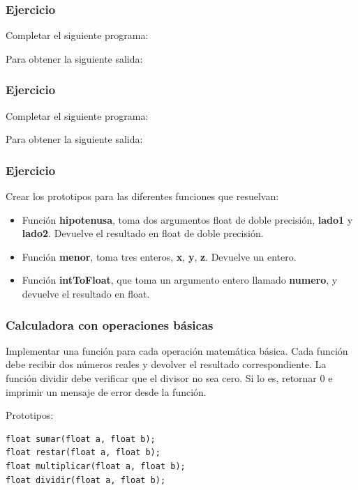 \subsubsection{Ejercicio}
Completar el siguiente programa:
\lstset{inputencoding=utf8/latin1}

Para obtener la siguiente salida:
{\small
  \lstset{inputencoding=utf8/latin1}
  
}

\subsubsection{Ejercicio}
Completar el siguiente programa:
\lstset{inputencoding=utf8/latin1}

Para obtener la siguiente salida:
{\small
  \lstset{inputencoding=utf8/latin1}
  
}

\subsubsection{Ejercicio}
Crear los prototipos para las diferentes funciones que resuelvan:
\begin{itemize}
  \item Función \textbf{hipotenusa}, toma dos argumentos float de doble precisión, \textbf{lado1} y \textbf{lado2}. Devuelve el resultado en float de doble precisión.
  \item Función \textbf{menor}, toma tres enteros, \textbf{x}, \textbf{y}, \textbf{z}. Devuelve un entero.
  \item Función \textbf{intToFloat}, que toma un argumento entero llamado \textbf{numero}, y devuelve el resultado en float.
\end{itemize}

\subsubsection{Calculadora con operaciones básicas}
Implementar una función para cada operación matemática básica. Cada función debe recibir dos números reales y devolver el resultado correspondiente. La función dividir debe verificar que el divisor no sea cero. Si lo es, retornar 0 e imprimir un mensaje de error desde la función.

Prototipos:

\begin{lstlisting}[style=customc, basicstyle=\ttfamily]
float sumar(float a, float b);
float restar(float a, float b);
float multiplicar(float a, float b);
float dividir(float a, float b);
\end{lstlisting}


